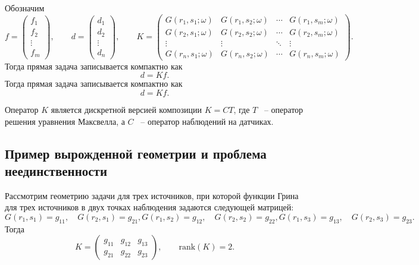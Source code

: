 \documentclass[a4paper,14pt,oneside,openany]{extarticle}
\begin{document}
Обозначим
\begin{equation}
    f = \begin{pmatrix}f_1\\ f_2 \\ \vdots \\ f_m\end{pmatrix},
    \qquad
    d = \begin{pmatrix}d_1\\ d_2 \\ \vdots \\ d_n\end{pmatrix},
    \qquad
    K = \begin{pmatrix}
        G(r_1,s_1;\omega) & G(r_1,s_2;\omega) & \cdots & G(r_1,s_m;\omega)\\
        G(r_2,s_1;\omega) & G(r_2,s_2;\omega) & \cdots & G(r_2,s_m;\omega)\\
        \vdots & \vdots & \ddots & \vdots\\
        G(r_n,s_1;\omega) & G(r_n,s_2;\omega) & \cdots & G(r_n,s_m;\omega)
    \end{pmatrix}.
\end{equation}
Тогда прямая задача записывается компактно как
\begin{equation}\label{eq:direct_matrix}
    d = Kf.
\end{equation}
Тогда прямая задача записывается компактно как
\begin{equation}\label{eq:direct_matrix}
    d=Kf.
\end{equation}

Оператор $K$ является дискретной версией композиции $K=C T$, где $T$ ~-- 
оператор решения уравнения Максвелла, а $C$ ~-- оператор наблюдений на датчиках.

\subsection{Пример вырожденной геометрии и проблема неединственности}

Рассмотрим геометрию задачи для трех источников, при которой функции Грина 
для трех источников в двух точках наблюдения задаются следующей матрицей:
\begin{equation}\label{eq:degenerate_G}
    G(r_1,s_1) = g_{11}, \quad G(r_2,s_1) = g_{21},
    G(r_1,s_2) = g_{12}, \quad G(r_2,s_2) = g_{22},
    G(r_1,s_3) = g_{13}, \quad G(r_2,s_3) = g_{23}.
\end{equation}
Тогда
\begin{equation}\label{eq:K_rank1}
    K = \begin{pmatrix}g_{11} & g_{12} & g_{13}\\ g_{21} & g_{22} & g_{23}\end{pmatrix},
    \qquad \mathrm{rank}(K) = 2.
\end{equation}
\end{document}
